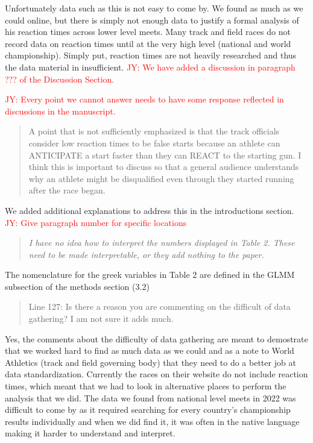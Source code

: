 \documentclass[12pt]{article}
\newcommand{\jy}[1]{\textcolor{red}{JY: #1}}
\newenvironment{comment}%
{\begin{quotation}\noindent\small\it\color{darkblue}\ignorespaces%
}{\end{quotation}}
\begin{document}
Unfortunately data such as this is not easy to come by.  We found as much as we
could online, but there is simply not enough data to justify a formal analysis
of his reaction times across lower level meets.  Many track and field races do
not record data on reaction times until at the very high level (national
and world championship).  Simply put, reaction times are not heavily researched
and thus the data material in insufficient.
\jy{We have added a discussion in paragraph ??? of the Discussion Section.}

\jy{Every point we cannot answer needs to have some response reflected
  in discussions in the manuscript.}

\begin{comment}
A point that is not sufficiently emphasized is that the track officials consider
low reaction times to be false starts because an athlete can ANTICIPATE a start
faster than they can REACT to the starting gun. I think this is important to
discuss so that a general audience understands why an athlete might be
disqualified even through they started running after the race began.  
\end{comment}

We added additional explanations to address this in the introductions section.
\jy{Give paragraph number for specific locations}

\begin{comment}I have no idea how to interpret the numbers displayed in Table 2. These
need to be made interpretable, or they add nothing to the paper.
\end{comment}

The nomenclature for the greek variables in Table 2 are defined in the GLMM
subsection of the methods section (3.2)

\begin{comment}
Line 127: Is there a reason you are commenting on the difficult of data
gathering? I am not sure it adds much.
\end{comment}

Yes, the comments about the difficulty of data gathering are meant to demostrate
that we worked hard to find as much data as we could and as a note to World
Athletics (track and field governing body) that they need to do a better job
at data standardization.  Currently the races on their website do not include
reaction times, which meant that we had to look in alternative places to perform
the analysis that we did.  The data we found from national level meets in 2022
was difficult to come by as it required searching for every country's championship
results individually and when we did find it, it was often in the native language
making it harder to understand and interpret.
\end{document}
